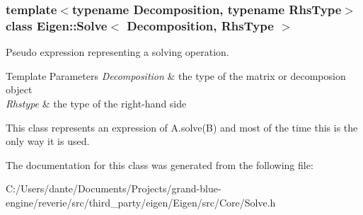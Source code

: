 \subsubsection*{template$<$typename Decomposition, typename Rhs\+Type$>$\newline
class Eigen\+::\+Solve$<$ Decomposition, Rhs\+Type $>$}

Pseudo expression representing a solving operation. 


\begin{DoxyTemplParams}{Template Parameters}
{\em Decomposition} & the type of the matrix or decomposion object \\
\hline
{\em Rhstype} & the type of the right-\/hand side\\
\hline
\end{DoxyTemplParams}
This class represents an expression of A.\+solve(\+B) and most of the time this is the only way it is used. 

The documentation for this class was generated from the following file\+:\begin{DoxyCompactItemize}
\item 
C\+:/\+Users/dante/\+Documents/\+Projects/grand-\/blue-\/engine/reverie/src/third\+\_\+party/eigen/\+Eigen/src/\+Core/Solve.\+h\end{DoxyCompactItemize}
